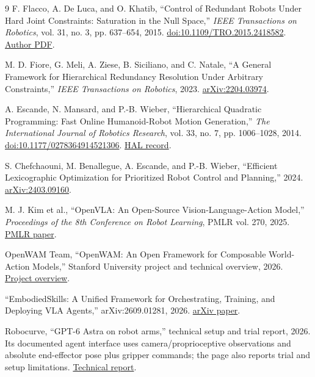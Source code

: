 \documentclass[11pt]{article}
\begin{document}
\begin{thebibliography}{9}
F. Flacco, A. De Luca, and O. Khatib, ``Control of Redundant Robots Under
Hard Joint Constraints: Saturation in the Null Space,'' \emph{IEEE
Transactions on Robotics}, vol. 31, no. 3, pp. 637--654, 2015.
\href{https://doi.org/10.1109/TRO.2015.2418582}{doi:10.1109/TRO.2015.2418582}.
\href{https://www.diag.uniroma1.it/~labrob/pub/papers/TRO_SNS_Jun2015.pdf}{Author PDF}.

M. D. Fiore, G. Meli, A. Ziese, B. Siciliano, and C. Natale, ``A General
Framework for Hierarchical Redundancy Resolution Under Arbitrary Constraints,''
\emph{IEEE Transactions on Robotics}, 2023.
\href{https://arxiv.org/abs/2204.03974}{arXiv:2204.03974}.

A. Escande, N. Mansard, and P.-B. Wieber, ``Hierarchical Quadratic
Programming: Fast Online Humanoid-Robot Motion Generation,'' \emph{The
International Journal of Robotics Research}, vol. 33, no. 7, pp. 1006--1028,
2014. \href{https://doi.org/10.1177/0278364914521306}{doi:10.1177/0278364914521306}.
\href{https://hal.science/hal-00751924}{HAL record}.

S. Chefchaouni, M. Benallegue, A. Escande, and P.-B. Wieber, ``Efficient
Lexicographic Optimization for Prioritized Robot Control and Planning,'' 2024.
\href{https://arxiv.org/abs/2403.09160}{arXiv:2403.09160}.

M. J. Kim et al., ``OpenVLA: An Open-Source Vision-Language-Action Model,''
\emph{Proceedings of the 8th Conference on Robot Learning}, PMLR vol. 270,
2025. \href{https://proceedings.mlr.press/v270/kim25c.html}{PMLR paper}.

OpenWAM Team, ``OpenWAM: An Open Framework for Composable World-Action
Models,'' Stanford University project and technical overview, 2026.
\href{https://openwam.stanford.edu/}{Project overview}.

``EmbodiedSkills: A Unified Framework for Orchestrating, Training, and
Deploying VLA Agents,'' arXiv:2609.01281, 2026.
\href{https://arxiv.org/abs/2609.01281}{arXiv paper}.

Robocurve, ``GPT-6 Astra on robot arms,'' technical setup and trial report,
2026. Its documented agent interface uses camera/proprioceptive observations
and absolute end-effector pose plus gripper commands; the page also reports
trial and setup limitations.
\href{https://openai.robocurve.org/gpt-6-astra/}{Technical report}.
\end{thebibliography}
\end{document}
